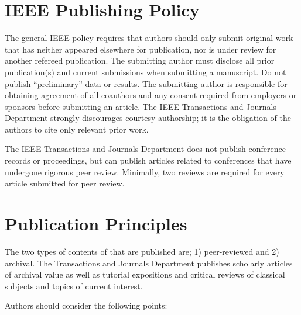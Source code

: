 \documentclass[journal,twoside,web]{ieeecolor}
\begin{document}
\section{IEEE Publishing Policy}
The general IEEE policy requires that authors should only submit original 
work that has neither appeared elsewhere for publication, nor is under 
review for another refereed publication. The submitting author must disclose 
all prior publication(s) and current submissions when submitting a 
manuscript. Do not publish ``preliminary'' data or results. The submitting 
author is responsible for obtaining agreement of all coauthors and any 
consent required from employers or sponsors before submitting an article. 
The IEEE Transactions and Journals Department strongly discourages courtesy 
authorship; it is the obligation of the authors to cite only relevant prior 
work.

The IEEE Transactions and Journals Department does not publish conference 
records or proceedings, but can publish articles related to conferences that 
have undergone rigorous peer review. Minimally, two reviews are required for 
every article submitted for peer review.

\section{Publication Principles}
The two types of contents of that are published are; 1) peer-reviewed and 2) 
archival. The Transactions and Journals Department publishes scholarly 
articles of archival value as well as tutorial expositions and critical 
reviews of classical subjects and topics of current interest. 

Authors should consider the following points:
\end{document}
